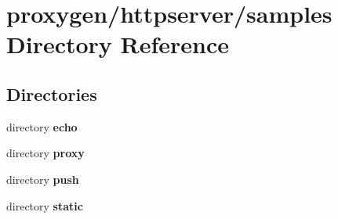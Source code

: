 \section{proxygen/httpserver/samples Directory Reference}
\label{dir_dee32a14547ba241e3f04cee2a0dc09f}
\subsection*{Directories}
\begin{DoxyCompactItemize}
\item 
directory {\bf echo}
\item 
directory {\bf proxy}
\item 
directory {\bf push}
\item 
directory {\bf static}
\end{DoxyCompactItemize}
